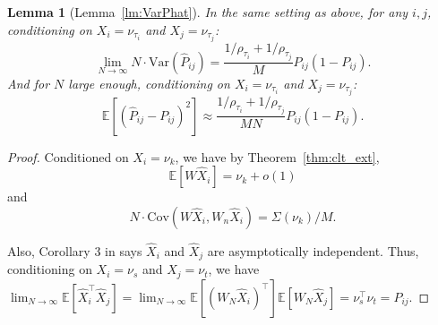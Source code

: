 \documentclass[journal,twoside,web]{ieeecolor}
\newtheorem{lemma}[fact]{Lemma}
\newcommand{\Ex}{\mathbb{E}}
\begin{document}
\begin{lemma}[Lemma~\ref{lm:VarPhat}]
In the same setting as above, for any $i, j$, conditioning on $X_i = \nu_{\tau_i}$ and $X_j = \nu_{\tau_j}$:
\[
	\lim_{N \to \infty} N \cdot \mathrm{Var}(\hat{P}_{ij}) =
    \frac{1/\rho_{\tau_i} + 1/\rho_{\tau_j}}{M} P_{ij} (1 - P_{ij}).
\]
And for $N$ large enough, conditioning on $X_i = \nu_{\tau_i}$ and $X_j = \nu_{\tau_j}$:
\[
	\Ex[(\hat{P}_{ij} - P_{ij})^2] \approx
    \frac{1/\rho_{\tau_i} + 1/\rho_{\tau_j}}{M N} P_{ij}(1-P_{ij}).
\]
\end{lemma}
\begin{proof}
Conditioned on $X_i = \nu_k$, we have by Theorem~\ref{thm:clt_ext},
\[
	\Ex[W \hat{X}_i] = \nu_k+o(1)
\]
and
\[
	N \cdot \mathrm{Cov}(W \hat{X}_i, W_n \hat{X}_i) = \Sigma(\nu_k)/M.
\]


Also, Corollary 3 in  says $\hat{X}_i$ and $\hat{X}_j$ are asymptotically independent. Thus, conditioning on $X_i = \nu_s$ and $X_j = \nu_t$, we have $\lim_{N\to\infty}\Ex[\hat{X}_i^{\top} \hat{X}_j] = \lim_{N\to\infty}\Ex[(W_N \hat{X}_i)^{\top}] \Ex[W_N \hat{X}_j] = \nu_s^{\top} \nu_t = P_{ij}$.


\end{proof}
\end{document}
